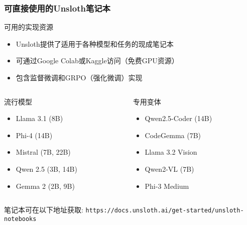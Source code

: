 \documentclass[aspectratio=169]{beamer}
\begin{document}
\begin{frame}
	\frametitle{可直接使用的Unsloth笔记本}
	\begin{block}{可用的实现资源}
		\begin{itemize}
			\item Unsloth提供了适用于各种模型和任务的现成笔记本
			\item 可通过Google Colab或Kaggle访问（免费GPU资源）
			\item 包含监督微调和GRPO（强化微调）实现
		\end{itemize}
	\end{block}
	\begin{columns}
		\begin{column}{0.48\textwidth}
			\begin{block}{流行模型}
				\begin{itemize}
					\item Llama 3.1 (8B)
					\item Phi-4 (14B)
					\item Mistral (7B, 22B)
					\item Qwen 2.5 (3B, 14B)
					\item Gemma 2 (2B, 9B)
				\end{itemize}
			\end{block}
		\end{column}
		\begin{column}{0.48\textwidth}
			\begin{block}{专用变体}
				\begin{itemize}
					\item Qwen2.5-Coder (14B)
					\item CodeGemma (7B)
					\item Llama 3.2 Vision
					\item Qwen2-VL (7B)
					\item Phi-3 Medium
				\end{itemize}
			\end{block}
		\end{column}
	\end{columns}
	\begin{center}
		\small{笔记本可在以下地址获取: \texttt{https://docs.unsloth.ai/get-started/unsloth-notebooks}}
	\end{center}
\end{frame}
\end{document}
